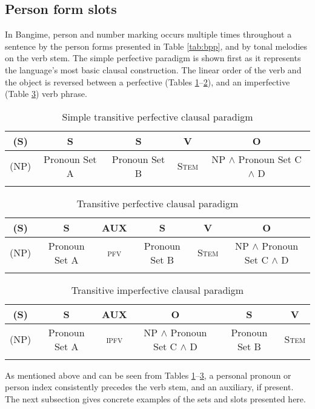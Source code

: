 \documentclass[output=paper]{langscibook}
\begin{document}
\subsection{Person form slots}
\label{subsec:vp}
In Bangime, person and number marking occurs multiple times throughout a sentence by the person forms presented in Table \ref{tab:bpp}, and by tonal melodies on the verb stem. The simple perfective paradigm is shown first as it represents the language's most basic clausal construction. The linear order of the verb and the object is reversed between a perfective (Tables \ref{tab:tp}--\ref{tab:tpp}), and an imperfective (Table \ref{tab:ti}) verb phrase.
\begin{table}[H]
	\caption{Simple transitive perfective clausal paradigm}
	\label{tab:tp}
	\begin{tabular}{|c|c|c|c|c|}
		\lsptoprule
		(S) & S & S & V & O \\ 
		\midrule 		
		(NP) & Pronoun Set A & Pronoun Set B & \textsc{Stem} & NP $\land$ Pronoun Set C $\land$ D  \\
		\lspbottomrule
	\end{tabular}
\end{table}
\begin{table}[H]
	\caption{Transitive perfective clausal paradigm}
	\label{tab:tpp}
	\begin{tabular}{|c|c|c|c|c|c|}
		\lsptoprule
		(S) & S & AUX & S & V & O \\ 
		\midrule 		
		(NP) & Pronoun Set A & \textsc{pfv} & Pronoun Set B & \textsc{Stem} & NP $\land$ Pronoun Set C $\land$ D  \\
		\lspbottomrule
	\end{tabular}
\end{table}
\begin{table}[H]
	\caption{Transitive imperfective clausal paradigm}
	\label{tab:ti}
	\begin{tabular}{|c|c|c|c|c|c|}
		\lsptoprule
		(S) & S & AUX & O & S & V \\ 
		\midrule 		
		(NP) & Pronoun Set A & \textsc{ipfv} & NP $\land$ Pronoun Set C $\land$ D & Pronoun Set B & \textsc{Stem} \\
		\lspbottomrule
	\end{tabular}
\end{table}
As mentioned above and can be seen from Tables \ref{tab:tp}--\ref{tab:ti}, a personal pronoun or person index consistently precedes the verb stem, and an auxiliary, if present. The next subsection gives concrete examples of the sets and slots presented here.
\end{document}
